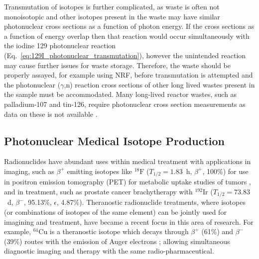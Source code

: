 \documentclass[../main.tex]{subfiles}
\begin{document}
Transmutation of isotopes is further complicated, as waste is often not monoisotopic and other isotopes present in the waste may have similar photonuclear cross sections as a function of photon energy. If the cross sections as a function of energy overlap then that reaction would occur simultaneously with the iodine 129 photonuclear reaction (Eq.~\ref{eq:129I_photonuclear_transmutation}), however the unintended  reaction may cause further issues for waste storage. Therefore, the waste should be properly assayed, for example using NRF, before transmutation is attempted and the photonuclear ($\gamma$,n) reaction cross sections of other long lived wastes present in the sample must be accommodated. Many long-lived reactor wastes, such as palladium-107 and tin-126, require photonuclear cross section measurements as data on these is not available \cite{zerkin2018experimental}. 

\subsection{Photonuclear Medical Isotope Production}
\label{sec:photonuclear_medical_isotope_production}

Radionuclides have abundant uses within medical treatment with applications in imaging, such as $\beta^{+}$ emitting isotopes like $^{18}\mathrm{F}$ ($T_{1/2}=1.83$~\si{\hour}, $\beta^{+}$, 100\%) for use in positron emission tomography (PET) for metabolic uptake studies of tumors \cite{orlhac2014tumor}, and in treatment, such as prostate cancer brachytherapy \cite{yuan2021proof} with $^{192}\textrm{Ir}$ ($T_{1/2} =73.83$~\si{\day}, $\beta^{-}$, 95.13\%, $\epsilon$, 4.87\%). Theranostic \cite{svenson2013theranostics} radionuclide treatments, where isotopes (or combinations of isotopes of the same element) can be jointly used for imagining and treatment, have became a recent focus in this area of research. For example, $^{64}\mathrm{Cu}$ is a theranostic isotope which decays through $\beta^{+}$ (61\%) and $\beta^{-}$ (39\%) routes with the emission of Auger electrons \cite{boschi2018emerging}; allowing simultaneous diagnostic imaging and therapy with the same radio-pharmaceutical.
\end{document}
